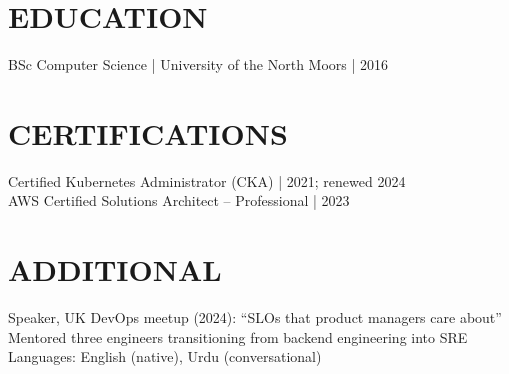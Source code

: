 \documentclass[11pt,a4paper]{article}
\begin{document}
\section*{EDUCATION}
BSc Computer Science | University of the North Moors | 2016
\section*{CERTIFICATIONS}
Certified Kubernetes Administrator (CKA) | 2021; renewed 2024\\
AWS Certified Solutions Architect -- Professional | 2023
\section*{ADDITIONAL}
Speaker, UK DevOps meetup (2024): “SLOs that product managers care about”\\
Mentored three engineers transitioning from backend engineering into SRE\\
Languages: English (native), Urdu (conversational)
\end{document}
